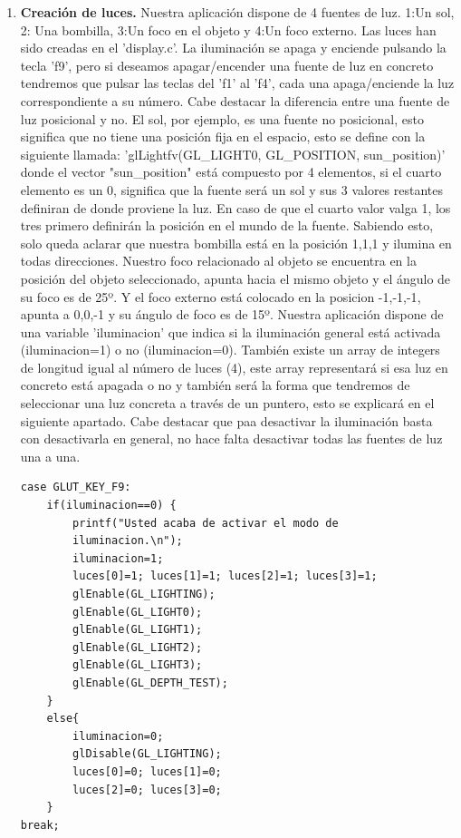 \documentclass[12pt,a4paper]{article}
\begin{document}
\begin{enumerate}
\begin{enumerate}
\begin{enumerate}
\item \textbf{Creación de luces.}
Nuestra aplicación dispone de 4 fuentes de luz. 1:Un sol, 2: Una bombilla, 3:Un foco en el objeto y 4:Un foco externo. Las luces han sido creadas en el 'display.c'. La iluminación se apaga y enciende pulsando la tecla 'f9', pero si deseamos apagar/encender una fuente de luz en concreto tendremos que pulsar las teclas del 'f1' al 'f4', cada una apaga/enciende la luz correspondiente a su número.\newline
Cabe destacar la diferencia entre una fuente de luz posicional y no. El sol, por ejemplo, es una fuente no posicional, esto significa que no tiene una posición fija en el espacio, esto se define con la siguiente llamada: 'glLightfv(GL\_LIGHT0, GL\_POSITION, sun\_position)' donde el vector "sun\_position" está compuesto por 4 elementos, si el cuarto elemento es un 0, significa que la fuente será un sol y sus 3 valores restantes definiran de donde proviene la luz. En caso de que el cuarto valor valga 1, los tres primero definirán la posición en el mundo de la fuente.\newline
Sabiendo esto, solo queda aclarar que nuestra bombilla está en la posición {1,1,1} y ilumina en todas direcciones. Nuestro foco relacionado al objeto se encuentra en la posición del objeto seleccionado, apunta hacia el mismo objeto y el ángulo de su foco es de 25º. Y el foco externo está colocado en la posicion {-1,-1,-1}, apunta a {0,0,-1} y su ángulo de foco es de 15º.\newline
Nuestra aplicación dispone de una variable 'iluminacion' que indica si la iluminación general está activada (iluminacion=1) o no (iluminacion=0). También existe un array de integers de longitud igual al número de luces (4), este array representará si esa luz en concreto está apagada o no y también será la forma que tendremos de seleccionar una luz concreta a través de un puntero, esto se explicará en el siguiente apartado.\newline
Cabe destacar que paa desactivar la iluminación basta con desactivarla en general, no hace falta desactivar todas las fuentes de luz una a una.
\begin{lstlisting}
case GLUT_KEY_F9:
    if(iluminacion==0) {
        printf("Usted acaba de activar el modo de
        iluminacion.\n");
        iluminacion=1;
        luces[0]=1; luces[1]=1; luces[2]=1; luces[3]=1;
        glEnable(GL_LIGHTING);
        glEnable(GL_LIGHT0);
        glEnable(GL_LIGHT1);
        glEnable(GL_LIGHT2);
        glEnable(GL_LIGHT3);
        glEnable(GL_DEPTH_TEST);
    }
    else{
        iluminacion=0;
        glDisable(GL_LIGHTING);
        luces[0]=0; luces[1]=0;
        luces[2]=0; luces[3]=0;
    }
break;


\end{lstlisting}
\end{enumerate}
\end{enumerate}
\end{enumerate}
\end{document}
